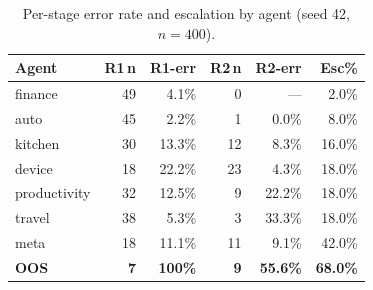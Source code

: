 \documentclass[11pt,a4paper]{article}
\begin{document}
\begin{table}[h]
\centering
\small
\caption{Per-stage error rate and escalation by agent (seed 42, $n=400$).}
\label{tab:perstage}
\begin{tabular}{@{}lrrrrr@{}}
\toprule
\textbf{Agent} & \textbf{R1\,n} & \textbf{R1-err} & \textbf{R2\,n} & \textbf{R2-err} & \textbf{Esc\%} \\
\midrule
finance & 49 & 4.1\% & 0 & --- & 2.0\% \\
auto & 45 & 2.2\% & 1 & 0.0\% & 8.0\% \\
kitchen & 30 & 13.3\% & 12 & 8.3\% & 16.0\% \\
device & 18 & 22.2\% & 23 & 4.3\% & 18.0\% \\
productivity & 32 & 12.5\% & 9 & 22.2\% & 18.0\% \\
travel & 38 & 5.3\% & 3 & 33.3\% & 18.0\% \\
meta & 18 & 11.1\% & 11 & 9.1\% & 42.0\% \\
\textbf{OOS} & \textbf{7} & \textbf{100\%} & \textbf{9} & \textbf{55.6\%} & \textbf{68.0\%} \\
\bottomrule
\end{tabular}
\end{table}
\end{document}

